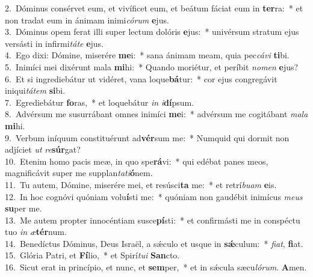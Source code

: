 {2.~}Dóminus consérvet eum, et vivíficet eum, et beátum fáciat eum in \textbf{ter}ra:~* et non tradat eum in ánimam inimi\textit{có}\textit{rum} \textbf{e}jus.\\
{3.~}Dóminus opem ferat illi super lectum dolóris \textbf{e}jus:~* univérsum stratum ejus versásti in infirmi\textit{tá}\textit{te} \textbf{e}jus.\\
{4.~}Ego dixi: Dómine, miserére \textbf{me}i:~* sana ánimam meam, quia pec\textit{cá}\textit{vi} \textbf{ti}bi.\\
{5.~}Inimíci mei dixérunt mala \textbf{mi}hi:~* Quando moriétur, et períbit \textit{no}\textit{men} \textbf{e}jus?\\
{6.~}Et si ingrediebátur ut vidéret, vana loque\textbf{bá}tur:~* cor ejus congregávit iniqui\textit{tá}\textit{tem} \textbf{si}bi.\\
{7.~}Egrediebátur \textbf{fo}ras,~* et loquebátur \textit{in} \textit{i}\textbf{dí}psum.\\
{8.~}Advérsum me susurrábant omnes inimíci \textbf{me}i:~* advérsum me cogitábant \textit{ma}\textit{la} \textbf{mi}hi.\\
{9.~}Verbum iníquum constituérunt ad\textbf{vér}sum me:~* Numquid qui dormit non adjíciet \textit{ut} \textit{re}\textbf{súr}gat?\\
{10.~}Etenim homo pacis meæ, in quo spe\textbf{rá}vi:~* qui edébat panes meos, magnificávit super me supplan\textit{ta}\textit{ti}\textbf{ó}nem.\\
{11.~}Tu autem, Dómine, miserére mei, et resúsci\textbf{ta} me:~* et retrí\textit{bu}\textit{am} \textbf{e}is.\\
{12.~}In hoc cognóvi quóniam volu\textbf{í}sti me:~* quóniam non gaudébit inimícus \textit{me}\textit{us} \textbf{su}per me.\\
{13.~}Me autem propter innocéntiam susce\textbf{pí}sti:~* et confirmásti me in conspéctu tuo \textit{in} \textit{æ}\textbf{tér}num.\\
{14.~}Benedíctus Dóminus, Deus Israël, a sǽculo et usque in \textbf{sǽ}culum:~* \textit{fi}\textit{at}, \textbf{fi}at.\\
{15.~}Glória Patri, et \textbf{Fí}lio,~* et Spirí\textit{tu}\textit{i} \textbf{San}cto.\\
{16.~}Sicut erat in princípio, et nunc, et \textbf{sem}per,~* et in sǽcula sæcu\textit{ló}\textit{rum}. \textbf{A}men.\\

